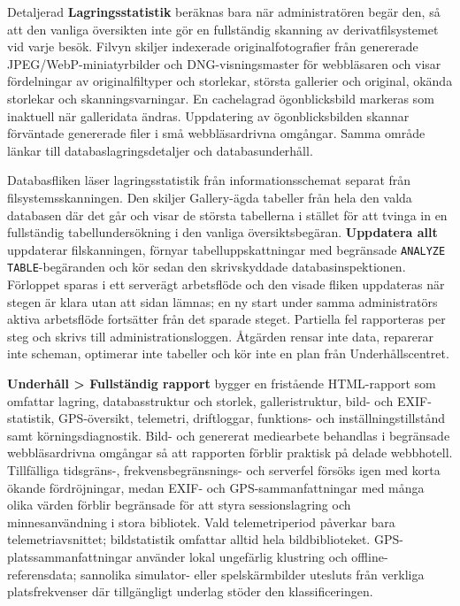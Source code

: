 \documentclass[11pt,a4paper]{article}
\newcommand{\ui}[1]{\textbf{#1}}
\newcommand{\codeword}[1]{\nolinkurl{#1}}
\begin{document}

Detaljerad \ui{Lagringsstatistik} beräknas bara när administratören begär den,
så att den vanliga översikten inte gör en fullständig skanning av
derivatfilsystemet vid varje besök. Filvyn skiljer indexerade
originalfotografier från genererade JPEG/WebP-miniatyrbilder och
DNG-visningsmaster för webbläsaren och visar fördelningar av originalfiltyper
och storlekar, största gallerier och original, okända storlekar och
skanningsvarningar. En cachelagrad ögonblicksbild markeras som inaktuell när
galleridata ändras. Uppdatering av ögonblicksbilden skannar förväntade
genererade filer i små webbläsardrivna omgångar. Samma område länkar till
databaslagringsdetaljer och databasunderhåll.

Databasfliken läser lagringsstatistik från informationsschemat separat från
filsystemsskanningen. Den skiljer Gallery-ägda tabeller från hela den valda
databasen där det går och visar de största tabellerna i stället för att tvinga
in en fullständig tabellundersökning i den vanliga översiktsbegäran.
\ui{Uppdatera allt} uppdaterar filskanningen, förnyar tabelluppskattningar med
begränsade \codeword{ANALYZE TABLE}-begäranden och kör sedan den skrivskyddade
databasinspektionen. Förloppet sparas i ett serverägt arbetsflöde och den visade
fliken uppdateras när stegen är klara utan att sidan lämnas; en ny start under
samma administratörs aktiva arbetsflöde fortsätter från det sparade steget.
Partiella fel rapporteras per steg och skrivs till administrationsloggen.
Åtgärden rensar inte data, reparerar inte scheman, optimerar inte tabeller och
kör inte en plan från Underhållscentret.

\ui{Underhåll > Fullständig rapport} bygger en fristående HTML-rapport som
omfattar lagring, databasstruktur och storlek, galleristruktur, bild- och
EXIF-statistik, GPS-översikt, telemetri, driftloggar, funktions- och
inställningstillstånd samt körningsdiagnostik. Bild- och genererat mediearbete
behandlas i begränsade webbläsardrivna omgångar så att rapporten förblir
praktisk på delade webbhotell. Tillfälliga tidsgräns-, frekvensbegränsnings- och
serverfel försöks igen med korta ökande fördröjningar, medan EXIF- och
GPS-sammanfattningar med många olika värden förblir begränsade för att styra
sessionslagring och minnesanvändning i stora bibliotek. Vald telemetriperiod
påverkar bara telemetriavsnittet; bildstatistik omfattar alltid hela
bildbiblioteket. GPS-platssammanfattningar använder lokal ungefärlig klustring
och offline-referensdata; sannolika simulator- eller spelskärmbilder utesluts
från verkliga platsfrekvenser där tillgängligt underlag stöder den
klassificeringen.
\end{document}
